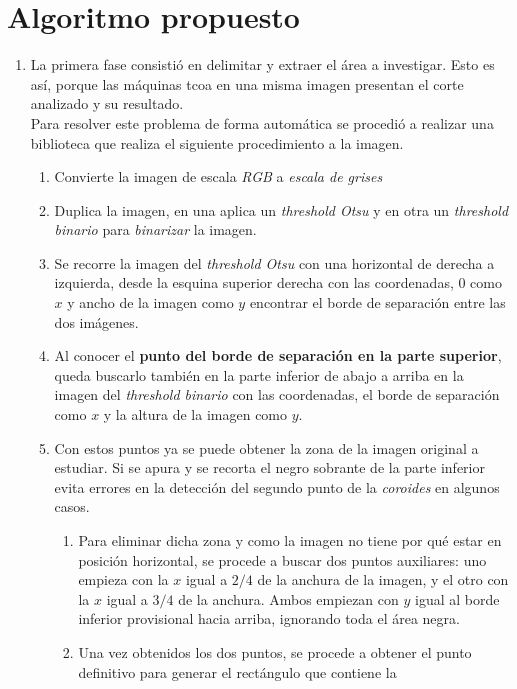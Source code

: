 \section{Algoritmo propuesto}
\begin{enumerate}
\item La primera fase consistió en delimitar y extraer el área a
  investigar. Esto es así, porque las máquinas \gls{tcoa} en una misma
  imagen presentan el corte analizado y su resultado.\\
  Para resolver este problema de forma automática se procedió a
  realizar una biblioteca que realiza el siguiente procedimiento a la
  imagen.
  \begin{enumerate}[label*=\arabic*.]
  \item Convierte la imagen de escala \emph{RGB} a \emph{escala de
      grises}
  \item Duplica la imagen, en una aplica un \emph{threshold Otsu} y en
    otra un \emph{threshold binario} para \emph{binarizar} la imagen.
  \item Se recorre la imagen del \emph{threshold Otsu} con una
    horizontal de derecha a izquierda, desde la esquina superior
    derecha con las coordenadas, 0 como $x$ y ancho de la imagen como
    $y$ encontrar el borde de separación entre las dos imágenes.
  \item Al conocer el  \textbf{punto del borde de separación en la parte
    superior}, queda buscarlo también en la parte inferior de abajo a arriba en la
    imagen del \emph{threshold binario} con las coordenadas, el borde
    de separación como $x$ y la altura de la imagen como $y$.
  \item Con estos puntos ya se puede obtener la zona de la imagen
    original a estudiar. Si se apura y se recorta el negro sobrante de
    la parte inferior evita errores en la detección del segundo punto
    de la \emph{coroides} en algunos casos.
    \begin{enumerate}[label*=\arabic*.]
    \item Para eliminar dicha zona y como la imagen no tiene por qué
      estar en posición horizontal, se procede a buscar dos puntos
      auxiliares: uno empieza con la $x$ igual a $2/4$ de la anchura
      de la imagen, y el otro con la $x$ igual a $3/4$ de la
      anchura. Ambos empiezan con $y$ igual al borde inferior
      provisional hacia arriba, ignorando toda el área negra.
    \item Una vez obtenidos los dos puntos, se procede a obtener el
      punto definitivo para generar el rectángulo que contiene la

\end{enumerate}
\end{enumerate}
\end{enumerate}
